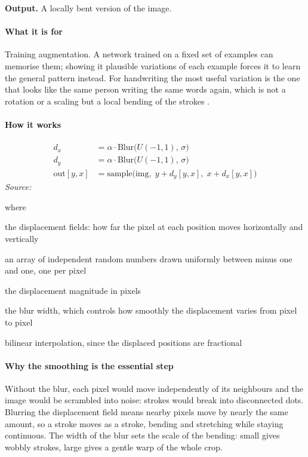 \noindent\textbf{Output.} A locally bent version of the image.


\paragraph{What it is for}
Training augmentation. A network trained on a fixed set of examples can memorise them; showing it plausible variations of each example forces it to learn the general pattern instead. For handwriting the most useful variation is the one that looks like the same person writing the same words again, which is not a rotation or a scaling but a local bending of the strokes \cite{simard2003}.


\paragraph{How it works}

\begin{equation}
\begin{aligned}d_x &= \alpha \cdot \mathrm{Blur}\big(U(-1,1),\, \sigma\big) \\d_y &= \alpha \cdot \mathrm{Blur}\big(U(-1,1),\, \sigma\big) \\\mathrm{out}[y,x] &= \mathrm{sample}\big(\mathrm{img},\; y + d_y[y,x],\; x + d_x[y,x]\big)\end{aligned}
\end{equation}
\noindent\emph{Source: }\cite{simard2003}


\noindent where
\begin{description}[leftmargin=2.4em,style=nextline,font=\normalfont\ttfamily]\setlength\itemsep{1pt}
  \item[{$d_x,\, d_y$}] \normalfont the displacement fields: how far the pixel at each position moves horizontally and vertically
  \item[{$U(-1,1)$}] \normalfont an array of independent random numbers drawn uniformly between minus one and one, one per pixel
  \item[{$\alpha$}] \normalfont the displacement magnitude in pixels
  \item[{$\sigma$}] \normalfont the blur width, which controls how smoothly the displacement varies from pixel to pixel
  \item[{$\mathrm{sample}$}] \normalfont bilinear interpolation, since the displaced positions are fractional
\end{description}

\paragraph{Why the smoothing is the essential step}
Without the blur, each pixel would move independently of its neighbours and the image would be scrambled into noise: strokes would break into disconnected dots. Blurring the displacement field means nearby pixels move by nearly the same amount, so a stroke moves as a stroke, bending and stretching while staying continuous. The width of the blur sets the scale of the bending: small gives wobbly strokes, large gives a gentle warp of the whole crop.

